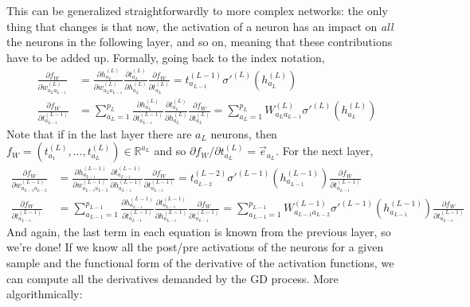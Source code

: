 \documentclass{article}
\begin{document}
This can be generalized straightforwardly to more complex networks: the only thing that changes is that now, the activation of a neuron has an impact on \emph{all} the neurons in the following layer, and so on, meaning that these contributions have to be added up. Formally, going back to the index notation,
\begin{align}
    \frac{\partial f_W}{\partial w^{(L)}_{a_L a_{L-1}}}
    &=
    \frac{\partial h^{(L)}_{a_L}}{\partial w^{(L)}_{a_L a_{L-1}}}
    \frac{\partial t^{(L)}_{a_L}}{\partial h^{(L)}_{a_L}}
    \frac{\partial f_W}{\partial t^{(L)}_{a_L}}
    = t^{(L-1)}_{a_{L-1}} \sigma'^{(L)} (h^{(L)}_{a_L})
     \\
    \frac{\partial f_W}{\partial t^{(L-1)}_{a_{L-1}}}
    &=
    \sum_{a_L=1}^{p_L}
    \frac{\partial h^{(L)}_{a_L}}{\partial t^{(L-1)}_{a_{L-1}}}
    \frac{\partial t^{(L)}_{a_L}}{\partial h^{(L)}_{a_L}}
    \frac{\partial f_W}{\partial t^{(L)}_{a_L}}
    =
    \sum_{a_L=1}^{p_L}
    W^{(L)}_{a_{L}a_{L-1}}
    \sigma'^{(L)} (h^{(L)}_{a_L})
\end{align}
Note that if in the last layer there are $a_L$ neurons, then $f_W = (t^{(L)}_{a_1},\dots,t^{(L)}_{a_L}) \in \mathbb{R}^{a_L}$ and so $\partial f_W / \partial t^{(L)}_{a_L} = \vec{e}_{a_L}$. For the next layer,
\begin{align}
    \frac{\partial f_W}{\partial w^{(L-1)}_{a_{L-1} a_{L-2}}}
    &=
    \frac{\partial h^{(L-1)}_{a_{L-1}}}{\partial w^{(L-1)}_{a_{L-1} a_{L-2}}}
    \frac{\partial t^{(L-1)}_{a_{L-1}}}{\partial h^{(L-1)}_{a_{L-1}}}
    \frac{\partial f_W}{\partial t^{(L-1)}_{a_{L-1}}}
    = t^{(L-2)}_{a_{L-2}} \sigma'^{(L-1)} (h^{(L-1)}_{a_{L-1}})
    \frac{\partial f_W}{\partial t^{(L-1)}_{a_{L-1}}}
     \\
    \frac{\partial f_W}{\partial t^{(L-1)}_{a_{L-1}}}
    &=
    \sum_{a_{L-1}=1}^{p_{L-1}}
    \frac{\partial h^{(L-1)}_{a_{L-1}}}{\partial t^{(L-1)}_{a_{L-1}}}
    \frac{\partial t^{(L-1)}_{a_{L-1}}}{\partial h^{(L-1)}_{a_{L-1}}}
    \frac{\partial f_W}{\partial t^{(L-1)}_{a_{L-1}}}
    =
    \sum_{a_{L-1}=1}^{p_{L-1}}
    W^{(L-1)}_{a_{L-1}a_{L-2}}
    \sigma'^{(L-1)} (h^{(L-1)}_{a_{L-1}})
    \frac{\partial f_W}{\partial t^{(L-1)}_{a_{L-1}}}
\end{align}
And again, the last term in each equation is known from the previous layer, so we're done! If we know all the post/pre activations of the neurons for a given sample and the functional form of the derivative of the activation functions, we can compute all the derivatives demanded by the GD process. More algorithmically:
\end{document}
